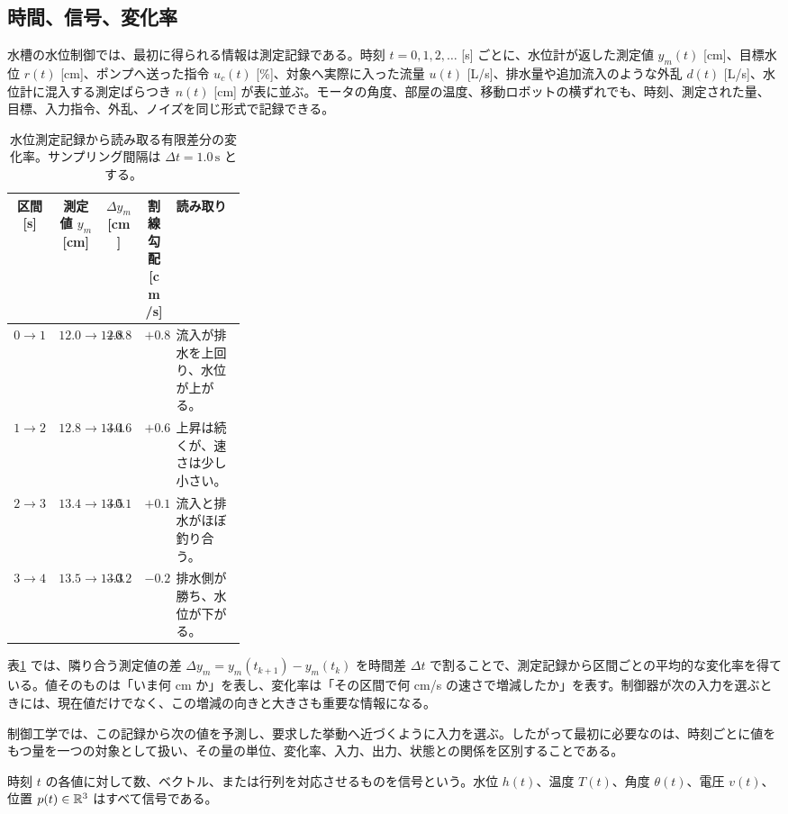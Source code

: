 \subsection{時間、信号、変化率}

水槽の水位制御では、最初に得られる情報は測定記録である。時刻 $t=0,1,2,\ldots$ [s] ごとに、水位計が返した測定値 $y_m(t)$ [cm]、目標水位 $r(t)$ [cm]、ポンプへ送った指令 $u_c(t)$ [\%]、対象へ実際に入った流量 $u(t)$ [L/s]、排水量や追加流入のような外乱 $d(t)$ [L/s]、水位計に混入する測定ばらつき $n(t)$ [cm] が表に並ぶ。モータの角度、部屋の温度、移動ロボットの横ずれでも、時刻、測定された量、目標、入力指令、外乱、ノイズを同じ形式で記録できる。

\begin{table}[tb]
\centering
\caption{水位測定記録から読み取る有限差分の変化率。サンプリング間隔は $\Delta t=1.0\,\mathrm{s}$ とする。}
\label{tab:sampled-water-rate}
{\scriptsize
\setlength{\tabcolsep}{3pt}
\renewcommand{\arraystretch}{1.18}
\begin{tabular}{cccc>{\raggedright\arraybackslash}p{0.30\linewidth}}
\hline
区間 [s] & 測定値 $y_m$ [cm] & $\Delta y_m$ [cm] & 割線勾配 [cm/s] & 読み取り\\
\hline
$0\to1$ & $12.0\to12.8$ & $+0.8$ & $+0.8$ & 流入が排水を上回り、水位が上がる。\\
$1\to2$ & $12.8\to13.4$ & $+0.6$ & $+0.6$ & 上昇は続くが、速さは少し小さい。\\
$2\to3$ & $13.4\to13.5$ & $+0.1$ & $+0.1$ & 流入と排水がほぼ釣り合う。\\
$3\to4$ & $13.5\to13.3$ & $-0.2$ & $-0.2$ & 排水側が勝ち、水位が下がる。\\
\hline
\end{tabular}
}
\end{table}

表\ref{tab:sampled-water-rate} では、隣り合う測定値の差 $\Delta y_m=y_m(t_{k+1})-y_m(t_k)$ を時間差 $\Delta t$ で割ることで、測定記録から区間ごとの平均的な変化率を得ている。値そのものは「いま何 cm か」を表し、変化率は「その区間で何 cm/s の速さで増減したか」を表す。制御器が次の入力を選ぶときには、現在値だけでなく、この増減の向きと大きさも重要な情報になる。

制御工学では、この記録から次の値を予測し、要求した挙動へ近づくように入力を選ぶ。したがって最初に必要なのは、時刻ごとに値をもつ量を一つの対象として扱い、その量の単位、変化率、入力、出力、状態との関係を区別することである。

\begin{definition}[信号]
時刻 $t$ の各値に対して数、ベクトル、または行列を対応させるものを信号という。水位 $h(t)$、温度 $T(t)$、角度 $\theta(t)$、電圧 $v(t)$、位置 $p(t)\in\mathbb{R}^3$ はすべて信号である。
\end{definition}

